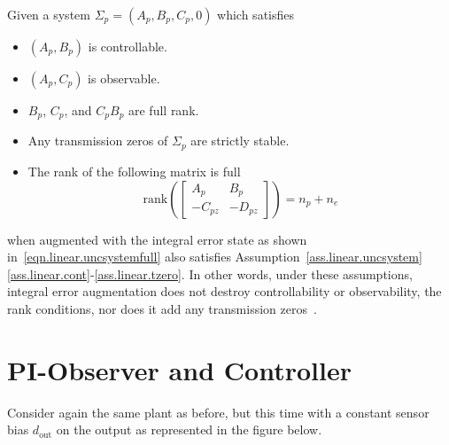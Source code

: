 \begin{rem-dan}\label{rem.plant}
  Given a system $\Sigma_{p}=(A_{p},B_{p},C_{p},0)$ which satisfies
  \begin{itemize}
    \itemsep0em
    \item{$(A_{p},B_{p})$ is controllable.\label{ass.p.cont}}
    \item{$(A_{p},C_{p})$ is observable.\label{ass.p.obsv}}
    \item{$B_{p}$, $C_{p}$, and $C_{p}B_{p}$ are full rank.\label{ass.p.rank}}
    \item{Any transmission zeros of $\Sigma_{p}$ are strictly stable.\label{ass.p.tzero}}
    \item{The rank of the following matrix is full}
    \begin{equation*}
      \text{rank}
      \left(
        \begin{bmatrix}
          A_{p} & B_{p} \\
          -C_{pz} & -D_{pz}
        \end{bmatrix}
      \right)
      =n_{p}+n_{e}
    \end{equation*}
  \end{itemize}
  when augmented with the integral error state as shown in~\eqref{eqn.linear.uncsystemfull} also satisfies Assumption~\ref{ass.linear.uncsystem}\ref{ass.linear.cont}-\ref{ass.linear.tzero}.
  In other words, under these assumptions, integral error augmentation does not destroy controllability or observability, the rank conditions, nor does it add any transmission zeros~\cite{lavretsky.output.2010}.
\end{rem-dan}

\section{PI-Observer and Controller}

Consider again the same plant as before, but this time with a constant sensor bias $d_{\text{out}}$ on the output as represented in the figure below.

